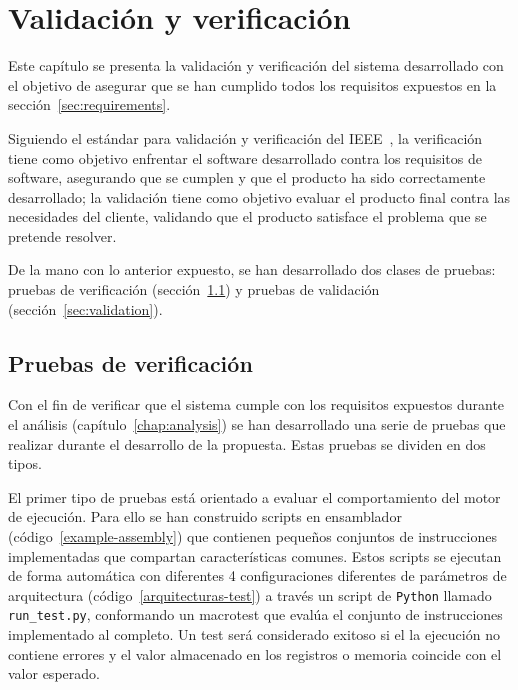 \chapter{Validación y verificación}\label{chap:validation}

Este capítulo se presenta la validación y verificación del sistema desarrollado con el objetivo de asegurar que se han cumplido todos los requisitos expuestos en la sección~\ref{sec:requirements}.

Siguiendo el estándar para validación y  verificación del IEEE~\cite{6204026}, la verificación tiene como objetivo enfrentar el software desarrollado contra los requisitos de software, asegurando que se cumplen y que el producto ha sido correctamente desarrollado; la {validación} tiene como objetivo evaluar el producto final contra las necesidades del cliente, validando que el producto satisface el problema que se pretende resolver.

De la mano con lo anterior expuesto, se han desarrollado dos clases de pruebas: pruebas de verificación (sección~\ref{sec:verification}) y pruebas de validación (sección~\ref{sec:validation}).

{\printtesttemplate}

{\FloatBarrier}

\section{Pruebas de verificación}\label{sec:verification}

Con el fin de verificar que el sistema cumple con los requisitos expuestos durante el análisis (capítulo~\ref{chap:analysis}) se han desarrollado una serie de pruebas que realizar durante el desarrollo de la propuesta. Estas pruebas se dividen en dos tipos. 

El primer tipo de pruebas está orientado a evaluar el comportamiento del motor de ejecución. Para ello se han construido scripts en ensamblador (código~\ref{example-assembly}) que contienen pequeños conjuntos de instrucciones implementadas que compartan características comunes. Estos scripts se ejecutan de forma automática con diferentes 4 configuraciones diferentes de parámetros de arquitectura (código~\ref{arquitecturas-test}) a través un script de \texttt{Python} llamado \texttt{run\_test.py}, conformando un macrotest que evalúa el conjunto de instrucciones implementado al completo. Un test será considerado exitoso si el la ejecución no contiene errores y el valor almacenado en los registros o memoria coincide con el valor esperado.

